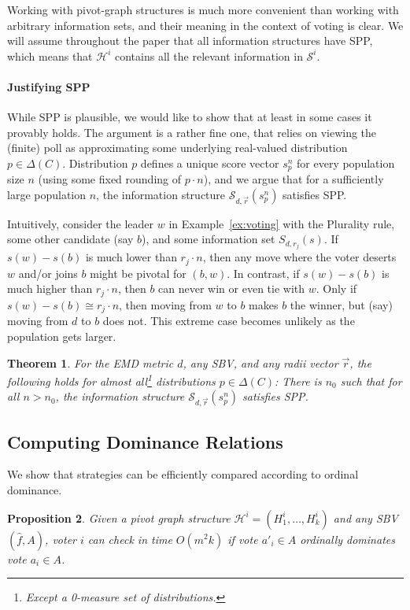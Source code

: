 \documentclass[letterpaper]{article} %
\def\calS{\mathcal{S}}
\def\calH{\mathcal{H}}
\newtheorem{theorem}{Theorem}
\newtheorem{proposition}[theorem]{Proposition}
\begin{document}
 Working with pivot-graph structures is much more convenient than working with arbitrary information sets, and their meaning in the context of voting is clear. We will assume throughout the paper that all information structures have SPP, which means that $\calH^i$ contains all the relevant information in $\calS^i$.

\paragraph{Justifying SPP}
While SPP is plausible, we would like to show that at least in some cases it provably holds. The argument is a rather fine one, that relies on viewing the (finite) poll as approximating some underlying real-valued distribution $p\in \Delta(C)$. Distribution $p$ defines a unique score vector $s_p^n$ for every population size $n$ (using some fixed rounding of $p\cdot n$), and we argue that for a sufficiently large population $n$, the information structure $\calS_{d,\vec r}(s_p^n)$ satisfies SPP.

Intuitively, consider the leader $w$ in Example~\ref{ex:voting} with the Plurality rule, some other candidate (say $b$), and some information set $S_{d, r_j}(s)$. If $s(w)-s(b)$ is much lower than $r_j\cdot n$, then any move where the voter deserts $w$ and/or joins $b$ might be pivotal for $(b,w)$. In contrast, if $s(w)-s(b)$ is much higher than $r_j \cdot n$, then $b$ can never win or even tie with $w$. Only if $s(w)-s(b) \cong r_j \cdot n$, then moving from $w$ to $b$ makes $b$ the winner, but (say) moving from $d$ to $b$ does not. This extreme case becomes unlikely as the population gets larger.

\begin{theorem}
For the EMD metric $d$, any SBV, and any radii vector $\vec r$, the following holds for almost all\footnote{Except a 0-measure set of distributions.} distributions $p\in \Delta(C)$: There is $n_0$ such that for all $n>n_0$, the information structure $\calS_{d,\vec r}(s^n_p)$ satisfies SPP.
\end{theorem}

\subsection{Computing Dominance Relations}
We show that strategies can be efficiently compared according to ordinal dominance.
\begin{proposition}
Given a pivot graph structure $\calH^i=(H^i_1,\ldots,H^i_k)$ and any SBV $(\hat f,A)$, voter $i$ can check in time $O(m^2k)$ if vote $a'_i\in A$ ordinally dominates vote $a_i\in A$.
\end{proposition}
\end{document}
